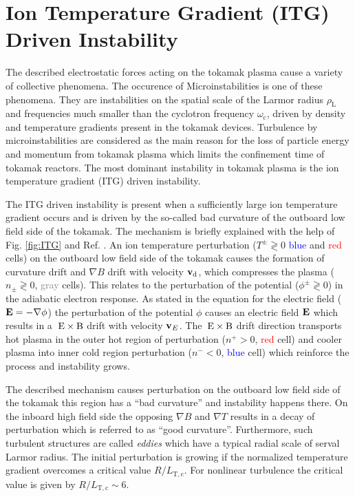 \newpage
\section{Ion Temperature Gradient (ITG) Driven Instability}
\label{sec:ITG}

The described electrostatic forces acting on the tokamak plasma cause a variety of collective phenomena. The occurence of Microinstabilities is one of these phenomena. They are instabilities on the spatial scale of the Larmor radius $\rho_\mathrm{L}$ and frequencies much smaller than the cyclotron frequency $\omega_\mathrm{c}$, driven by density and temperature gradients present in the tokamak devices. Turbulence by microinstabilities are considered as the main reason for the loss of particle energy and momentum from tokamak plasma \cite{Brizard2007, Garbet2010, Horton1999} which limits the confinement time of tokamak reactors. The most dominant instability in tokamak plasma is the ion temperature gradient (ITG) driven instability. \cite{Coppi1967, Cowley1991, Rudakov1961}


The ITG driven instability is present when a sufficiently large ion temperature gradient occurs and is driven by the so-called bad curvature of the outboard low field side of the tokamak. The mechanism is briefly explained with the help of Fig. \ref{fig:ITG} and Ref. . An ion temperature perturbation ($T^\pm \gtrless 0$ \textcolor{blue}{blue} and \textcolor{red}{red} cells) on the outboard low field side of the tokamak causes the formation of curvature drift and $\nabla B$ drift with velocity $\boldsymbol{\mathbf{v}}_\mathrm{d}$, which compresses the plasma ($n_\pm \gtrless 0$, \textcolor{gray}{gray} cells). This relates to the perturbation of the potential ($\phi^\pm  \gtrless 0$) in the adiabatic electron response. As stated in the equation for the electric field ($\boldsymbol{\mathbf{E}} = -\nabla \phi$) the perturbation of the potential $\phi$ causes an electric field $\boldsymbol{\mathbf{E}}$ which results in a $\mathrm{\:E}\times\mathrm{B}$ drift with velocity $\boldsymbol{\mathbf{v}}_E$. The $\mathrm{\:E}\times\mathrm{B}$ drift direction transports hot plasma in the outer hot region of perturbation ($n^+ > 0$, \textcolor{red}{red} cell) and cooler plasma into inner cold region perturbation ($n^- < 0$, \textcolor{blue}{blue} cell) which reinforce the process and instability grows.\bigskip

The described mechanism causes perturbation on the outboard low field side of the tokamak this region has a \enquote{bad curvature} and instability happens there. On the inboard high field side the opposing $\nabla B$ and $\nabla T$ results in a decay of perturbation which is referred to as \enquote{good curvature}. Furthermore, such turbulent structures are called \textit{eddies} which have a typical radial scale of serval Larmor radius. \cite{Newins2006}
The initial perturbation is growing if the normalized temperature gradient overcomes a critical value $R/L_\mathrm{T,c}$. For nonlinear turbulence the critical value is given by $R/L_\mathrm{T,c} \sim 6$. \cite{Dimits2000, Isliker2010}